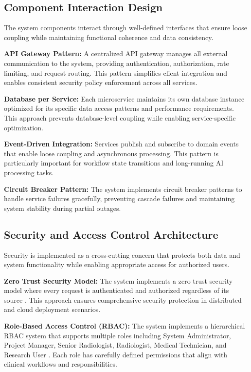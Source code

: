 \subsection{Component Interaction Design}

The system components interact through well-defined interfaces that ensure loose coupling while maintaining functional coherence and data consistency.

\textbf{API Gateway Pattern:} A centralized API gateway manages all external communication to the system, providing authentication, authorization, rate limiting, and request routing. This pattern simplifies client integration and enables consistent security policy enforcement across all services.

\textbf{Database per Service:} Each microservice maintains its own database instance optimized for its specific data access patterns and performance requirements. This approach prevents database-level coupling while enabling service-specific optimization.

\textbf{Event-Driven Integration:} Services publish and subscribe to domain events that enable loose coupling and asynchronous processing. This pattern is particularly important for workflow state transitions and long-running AI processing tasks.

\textbf{Circuit Breaker Pattern:} The system implements circuit breaker patterns to handle service failures gracefully, preventing cascade failures and maintaining system stability during partial outages.

\subsection{Security and Access Control Architecture}

Security is implemented as a cross-cutting concern that protects both data and system functionality while enabling appropriate access for authorized users.

\textbf{Zero Trust Security Model:} The system implements a zero trust security model where every request is authenticated and authorized regardless of its source \cite{rose2020zero}. This approach ensures comprehensive security protection in distributed and cloud deployment scenarios.

\textbf{Role-Based Access Control (RBAC):} The system implements a hierarchical RBAC system that supports multiple roles including System Administrator, Project Manager, Senior Radiologist, Radiologist, Medical Technician, and Research User \cite{sandhu1996role}. Each role has carefully defined permissions that align with clinical workflows and responsibilities.

